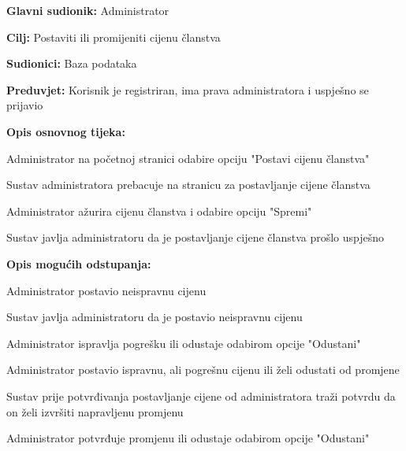 \noindent {}
\begin{packed_item}
	\item \textbf{Glavni sudionik:} Administrator
	\item  \textbf{Cilj:} Postaviti ili promijeniti cijenu članstva 
	\item  \textbf{Sudionici:} Baza podataka
	\item  \textbf{Preduvjet:} Korisnik je registriran, ima prava administratora i uspješno se prijavio
	\item  \textbf{Opis osnovnog tijeka:}
	
	\item[] \begin{packed_enum}
		
		\item Administrator na početnoj stranici odabire opciju "Postavi cijenu članstva"
		\item Sustav administratora prebacuje na stranicu za postavljanje cijene članstva
		\item Administrator ažurira cijenu članstva i odabire opciju "Spremi"
		\item Sustav javlja administratoru da je postavljanje cijene članstva prošlo uspješno
	\end{packed_enum}
	
	\item  \textbf{Opis mogućih odstupanja:}
	
	\item[] \begin{packed_item}
		
		\item[4.a] Administrator postavio neispravnu cijenu
		\item[] \begin{packed_enum}
			
			\item Sustav javlja administratoru da je postavio neispravnu cijenu
			\item Administrator ispravlja pogrešku ili odustaje odabirom opcije "Odustani"
			
		\end{packed_enum}
		\item[4.b] Administrator postavio ispravnu, ali pogrešnu cijenu ili želi odustati od promjene
		\item[] \begin{packed_enum}
			
			\item Sustav prije potvrđivanja postavljanje cijene od administratora traži potvrdu da on želi izvršiti napravljenu promjenu
			\item Administrator potvrđuje promjenu ili odustaje odabirom opcije "Odustani"
			
		\end{packed_enum}
	\end{packed_item}
\end{packed_item}


